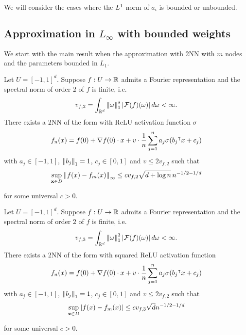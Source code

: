 We will consider the cases where the $L^{1}$-norm of $a_i$ is bounded or
unbounded.

\subsection{Approximation in $L_{\infty}$ with bounded weights}

We start with the main result when the approximation with 2NN with $m$ nodes and 
the parameters bounded in $L_1$.

\begin{theorem}
    \label{thm:appro_bound_l1}
    Let $U = [-1,1]^d$. Suppose $f: U \to \mathbb{R}$ admits a Fourier representation
    and the spectral norm of order $2$ of $f$ is finite, i.e.
    \begin{equation}
        v_{f,2} = \int_{\mathbb{R}^d} \left\| \omega \right\|_1^s \left| \mathcal{F}(f)(\omega) \right| 
        d\omega < \infty.
    \end{equation}
    There exists a 2NN of the form with ReLU activation function $\sigma$
    \begin{equation}
        f_n(x) = f(0) + \nabla f(0) \cdot x + v \cdot 
        \frac{1}{n} \sum_{j=1}^n a_j \sigma(b_j{}^{\intercal} x + c_j)
    \end{equation}
    with $a_j\in[-1,1]$, $\left\| b_j \right\|_1 = 1$, $c_j\in[0,1]$ and $v \leq
    2v_{f,2}$ such that
    \begin{equation}
        \sup_{\mathbf{x} \in D} \left\| f(x) - f_m(x) \right\|_{\infty} 
        \leq c v_{f,2} \sqrt{d+\log{n}} \, n^{-1/2-1/d}
    \end{equation}

    for some universal $c > 0$.
\end{theorem}

\begin{theorem}
    Let $U = [-1,1]^d$. Suppose $f: U \to \mathbb{R}$ admits a Fourier representation
    and the spectral norm of order $2$ of $f$ is finite, i.e.
    \begin{equation}
        v_{f,3} = \int_{\mathbb{R}^d} \left\| \omega \right\|_1^3 \left| \mathcal{F}(f)(\omega) \right| 
        d\omega < \infty.
    \end{equation}
    There exists a 2NN of the form with squared ReLU activation function
    \begin{equation}
        f_n(x) = f(0) + \nabla f(0) \cdot x + v \cdot 
        \frac{1}{n} \sum_{j=1}^n a_j \sigma(b_j{}^{\intercal} x + c_j)
    \end{equation}
    with $a_j\in[-1,1]$, $\left\| b_j \right\|_1 = 1$, $c_j\in[0,1]$ and $v \leq
    2v_{f,2}$ such that
    \begin{equation}
        \sup_{\mathbf{x} \in D} \left| f(x) - f_m(x) \right| \leq 
        c v_{f,3} \sqrt{d} n^{-1/2-1/d}
    \end{equation}

    for some universal $c > 0$.
\end{theorem}

